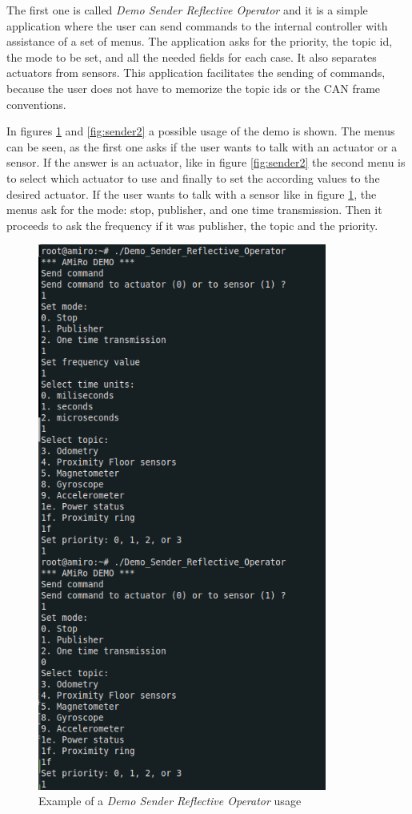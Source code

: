 \documentclass[12pt]{report}%
\begin{document}
The first one is called \textit{Demo Sender Reflective Operator} and it is a simple application where the user can send commands to the internal controller with assistance of a set of menus. The application asks for the priority, the topic id, the mode to be set, and all the needed fields for each case. It also separates actuators from sensors. This application facilitates the sending of commands, because the user does not have to memorize the topic ids or the CAN frame conventions.

In figures \ref{fig:sender1} and \ref{fig:sender2} a possible usage of the demo is shown. The menus can be seen, as the first one asks if the user wants to talk with an actuator or a sensor. If the answer is an actuator, like in figure \ref{fig:sender2} the second menu is to select which actuator to use and finally to set the according values to the desired actuator. If the user wants to talk with a sensor like in figure \ref{fig:sender1}, the menus ask for the mode: stop, publisher, and one time transmission. Then it proceeds to ask the frequency if it was publisher, the topic and the priority.

\begin{figure}[ht]
 \centering
 \includegraphics[width=\textwidth, height=18cm]{sender_example}
		\caption{Example of a \textit{Demo Sender Reflective Operator} usage}
		\label{fig:sender1}
\end{figure}
\end{document}
